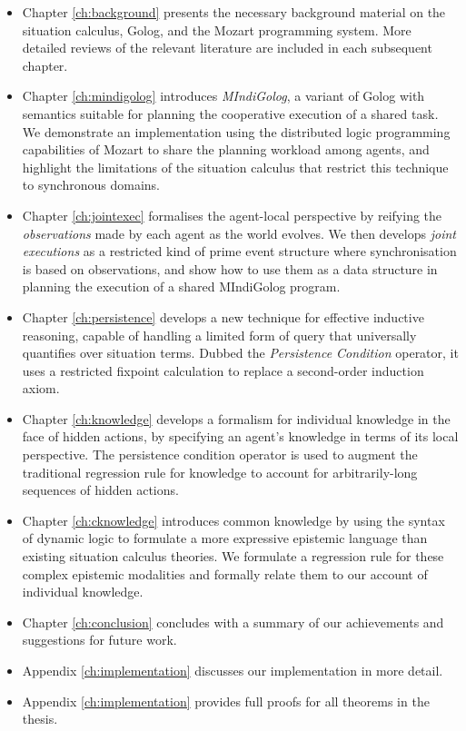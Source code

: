 \begin{itemize}
\item Chapter \ref{ch:background} presents the necessary background material
on the situation calculus, Golog, and the Mozart programming system.
More detailed reviews of the relevant literature are included in each
subsequent chapter.
\item Chapter \ref{ch:mindigolog} introduces \emph{MIndiGolog}, a variant
of Golog with semantics suitable for planning the cooperative execution
of a shared task\emph{.} We demonstrate an implementation using the
distributed logic programming capabilities of Mozart to share the
planning workload among agents, and highlight the limitations of the
situation calculus that restrict this technique to synchronous domains. 
\item Chapter \ref{ch:jointexec} formalises the agent-local perspective
by reifying the \emph{observations} made by each agent as the world
evolves. We then develops \emph{joint executions} as a restricted
kind of prime event structure where synchronisation is based on observations,
and show how to use them as a data structure in planning the execution
of a shared MIndiGolog program. 
\item Chapter \ref{ch:persistence} develops a new technique for effective
inductive reasoning, capable of handling a limited form of query that
universally quantifies over situation terms. Dubbed the \emph{Persistence
Condition} operator, it uses a restricted fixpoint calculation to
replace a second-order induction axiom. 
\item Chapter \ref{ch:knowledge} develops a formalism for individual knowledge
in the face of hidden actions, by specifying an agent's knowledge
in terms of its local perspective. The persistence condition operator
is used to augment the traditional regression rule for knowledge to
account for arbitrarily-long sequences of hidden actions. 
\item Chapter \ref{ch:cknowledge} introduces common knowledge by using
the syntax of dynamic logic to formulate a more expressive epistemic
language than existing situation calculus theories. We formulate a
regression rule for these complex epistemic modalities and formally
relate them to our account of individual knowledge. 
\item Chapter \ref{ch:conclusion} concludes with a summary of our achievements
and suggestions for future work. 
\item Appendix \ref{ch:implementation} discusses our implementation in
more detail. 
\item Appendix \ref{ch:implementation} provides full proofs for all theorems
in the thesis. 
\end{itemize}
